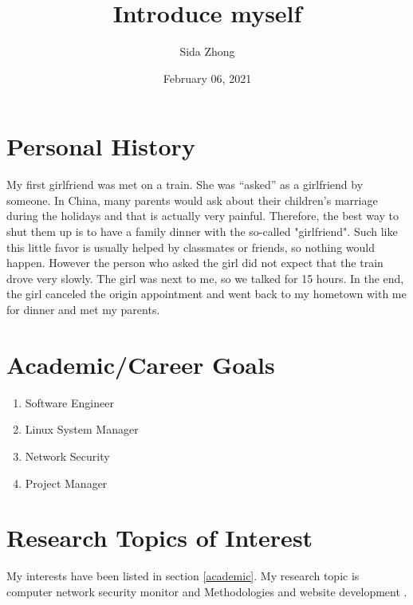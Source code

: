 \documentclass[11pt]{article}
\title{Introduce myself}
\author{Sida Zhong}
\date{February 06, 2021}
\begin{document}
\maketitle

\section{Personal History}
    My first girlfriend was met on a train. She was “asked” as a girlfriend by someone. In China, many parents would ask about their children's marriage during the holidays and that is actually very painful.
Therefore, the best way to shut them up is to have a family dinner with the so-called "girlfriend". Such like this little favor is usually helped by classmates or friends, so nothing would happen. However the person who asked the girl did not expect that the train drove very slowly. The girl was next to me, so we talked for 15 hours. In the end, the girl canceled the origin appointment and went back to my hometown with me for dinner and met my parents. 

\section{Academic/Career Goals \label{academic}}
\begin{enumerate}
    \item Software Engineer
    \item Linux System Manager
    \item Network Security
    \item Project Manager
\end{enumerate}

\section{Research Topics of Interest}
My interests have been listed in section \ref{academic}. My research topic is computer network security monitor \cite{heberlein1989network} and Methodologies and website development \cite{taylor2002methodologies}.



\end{document}
